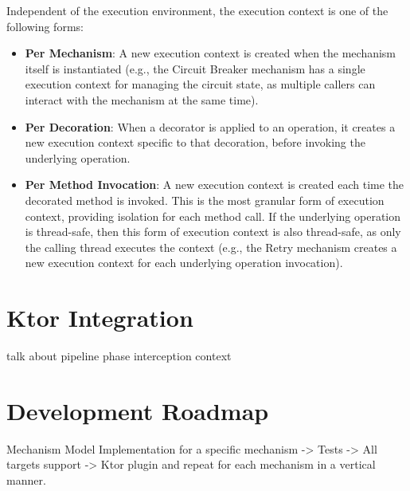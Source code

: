 Independent of the execution environment, the execution context is one of the following forms:

\begin{itemize}
    \item \textbf{Per Mechanism}: A new execution context is created when the mechanism itself is instantiated (e.g., the Circuit Breaker mechanism has a single execution context for managing the circuit state, as multiple callers can interact with the mechanism at the same time).
    \item \textbf{Per Decoration}: When a decorator is applied to an operation, it creates a new execution context specific to that decoration, before invoking the underlying operation.
    \item \textbf{Per Method Invocation}: A new execution context is created each time the decorated method is invoked.
    This is the most granular form of execution context, providing isolation for each method call.
    If the underlying operation is thread-safe, then this form of execution context is also thread-safe, as only the calling thread executes the context (e.g., the Retry mechanism creates a new execution context for each underlying operation invocation).
\end{itemize}


\section{Ktor Integration}\label{sec:ktor-integration}

talk about pipeline phase interception context


\section{Development Roadmap}\label{sec:development-roadmap}

Mechanism Model Implementation for a specific mechanism -> Tests -> All targets support -> Ktor plugin
and repeat for each mechanism in a vertical manner.
